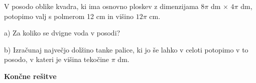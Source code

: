 \documentclass[a4paper,11pt]{letter}
\newcommand{\razdelek}[1]{%
  \vspace{0.5cm}
  \begin{center}
  \colorbox{brown!25}{\parbox{0.97\textwidth}{\centering\vspace{2pt}\large\textbf{#1}\vspace{2pt}}}
  \end{center}
  \vspace{0.2cm}
}
\begin{document}
\begin{naloga}
V posodo oblike kvadra, ki ima osnovno ploskev z dimenzijama $8\pi$ dm $\times$ $4\pi$ dm,
potopimo valj s polmerom 12 cm in višino $12\pi$ cm.

a) Za koliko se dvigne voda v posodi?

b) Izračunaj največjo dolžino tanke palice, ki jo še lahko v celoti potopimo v to posodo,
v kateri je višina tekočine $\pi$ dm.
\end{naloga}

\vfill
\begin{center}
\end{center}

\newpage
\razdelek{Končne rešitve}
\end{document}
